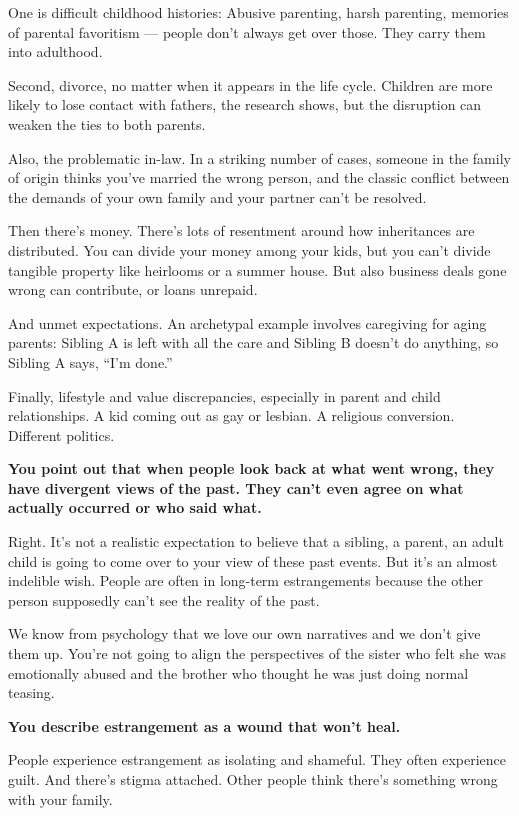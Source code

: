 One is difficult childhood histories: Abusive parenting, harsh
parenting, memories of parental favoritism --- people don't always get
over those. They carry them into adulthood.

Second, divorce, no matter when it appears in the life cycle. Children
are more likely to lose contact with fathers, the research shows, but
the disruption can weaken the ties to both parents.

Also, the problematic in-law. In a striking number of cases, someone in
the family of origin thinks you've married the wrong person, and the
classic conflict between the demands of your own family and your partner
can't be resolved.

Then there's money. There's lots of resentment around how inheritances
are distributed. You can divide your money among your kids, but you
can't divide tangible property like heirlooms or a summer house. But
also business deals gone wrong can contribute, or loans unrepaid.

And unmet expectations. An archetypal example involves caregiving for
aging parents: Sibling A is left with all the care and Sibling B doesn't
do anything, so Sibling A says, ``I'm done.''

Finally, lifestyle and value discrepancies, especially in parent and
child relationships. A kid coming out as gay or lesbian. A religious
conversion. Different politics.

\textbf{You point out that when people look back at what went wrong,
they have divergent views of the past. They can't even agree on what
actually occurred or who said what.}

Right. It's not a realistic expectation to believe that a sibling, a
parent, an adult child is going to come over to your view of these past
events. But it's an almost indelible wish. People are often in long-term
estrangements because the other person supposedly can't see the reality
of the past.

We know from psychology that we love our own narratives and we don't
give them up. You're not going to align the perspectives of the sister
who felt she was emotionally abused and the brother who thought he was
just doing normal teasing.

\textbf{You describe estrangement as a wound that won't heal.}

People experience estrangement as isolating and shameful. They often
experience guilt. And there's stigma attached. Other people think
there's something wrong with your family.

